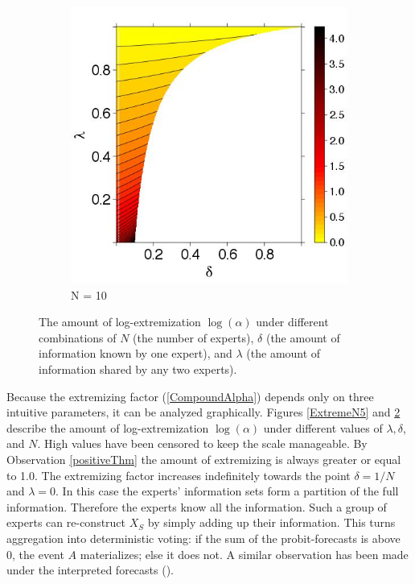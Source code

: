 \documentclass[11pt,twoside]{article}
\theoremstyle{definition}
\theoremstyle{definition}
\begin{document}
\begin{figure}
\begin{subfigure}[b]{0.45\textwidth}
                \includegraphics[width=\textwidth]{ExtremeN10.jpeg}
\caption{N = 10}
\label{ExtremeN30}
        \end{subfigure}
        \caption{ The amount of log-extremization $\log(\alpha)$ under different combinations of $N$ (the number of experts), $\delta$ (the amount of information known by one expert), and $\lambda$ (the amount of information shared by any two experts).}
\end{figure}



Because the extremizing factor (\ref{CompoundAlpha}) depends only on three intuitive parameters, it can be analyzed graphically. Figures \ref{ExtremeN5} and \ref{ExtremeN30} describe the amount of log-extremization $\log(\alpha)$ under different values of $\lambda, \delta$, and $N$. High values have been censored to keep the scale manageable. By Observation \ref{positiveThm} the amount of extremizing is always greater or equal to 1.0. The extremizing factor increases indefinitely towards the point $\delta = 1/N$ and $\lambda = 0$. In this case the experts' information sets form a partition of the full information. Therefore the experts know all the information. Such a group of experts can re-construct $X_S$ by simply adding up their  information. This turns aggregation into deterministic voting: if the sum of the probit-forecasts is above 0, the event $A$ materializes; else it does not. A similar observation has been made under the interpreted forecasts (\cite{hong2009interpreted}). 
\end{document}

